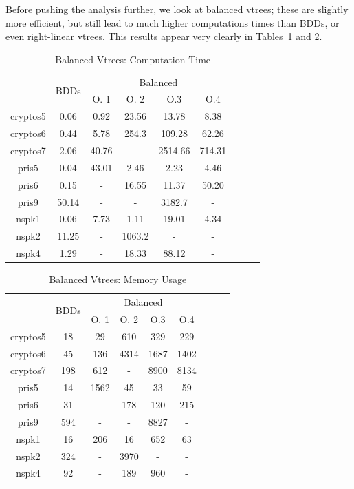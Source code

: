 \documentclass[11pt]{article}
\begin{document}
Before pushing the analysis further, we look at balanced vtrees; these are slightly more efficient, but still lead to much higher computations times than BDDs, or even right-linear vtrees. This results appear very clearly in Tables~\ref{table:otherstandardvtrees2time} and \ref{table:otherstandardvtrees2memory}.

\begin{table}
\centering
\begin{tabular}{|*{9}{c|}}
\hline
 & \multirow{2}{*}{BDDs} & \multicolumn{4}{c|}{Balanced} \\ \cline{3-6}
 & & O. 1& O. 2 & O.3 & O.4 \\ \hline
cryptos5 & 0.06& 0.92 & 23.56 & 13.78 & 8.38\\ \hline
cryptos6 & 0.44 & 5.78 & 254.3& 109.28 & 62.26\\ \hline
cryptos7 & 2.06& 40.76 & - & 2514.66 & 714.31 \\ \hline
pris5 & 0.04 & 43.01 & 2.46& 2.23 & 4.46 \\ \hline
pris6 & 0.15 & - & 16.55 & 11.37 & 50.20 \\ \hline
pris9 & 50.14 & - & - & 3182.7& - \\ \hline
nspk1 &0.06 & 7.73 & 1.11 & 19.01 & 4.34 \\ \hline
nspk2 &11.25 & - & 1063.2 &- & - \\ \hline
nspk4 & 1.29& - & 18.33 & 88.12& -\\ \hline
\end{tabular}
\caption{Balanced Vtrees: Computation Time}
\label{table:otherstandardvtrees2time}
\end{table}
\begin{table}
\centering
\begin{tabular}{|*{9}{c|}}
\hline
 & \multirow{2}{*}{BDDs} & \multicolumn{4}{c|}{Balanced} \\ \cline{3-6}
 & & O. 1& O. 2 & O.3 & O.4 \\ \hline
cryptos5 & 18 & 29 & 610 & 329 & 229 \\ \hline
cryptos6 & 45 & 136 & 4314 & 1687 & 1402\\ \hline
cryptos7 & 198& 612 & - & 8900 & 8134 \\ \hline
pris5 & 14 & 1562 & 45 & 33& 59 \\\hline
pris6 &31 & - & 178 & 120& 215 \\ \hline
pris9 &594 & - & - & 8827& -\\ \hline
nspk1 & 16 & 206 & 16 & 652& 63 \\ \hline
nspk2 &324 & - & 3970 & - &- \\ \hline
nspk4 &92 & - & 189 & 960& - \\ \hline
\end{tabular}
\caption{Balanced Vtrees: Memory Usage}
\label{table:otherstandardvtrees2memory}
\end{table}
\end{document}
